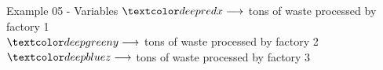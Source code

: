 \begin{frame}{Example 05 - Variables}
\LARGE{
$\colora{x} \longrightarrow$
    tons of waste processed by factory 1 \\ \vspace{1cm}
$\colorb{y} \longrightarrow$
    tons of waste processed by factory 2 \\ \vspace{1cm}
$\colorc{z} \longrightarrow$
    tons of waste processed by factory 3
}
\end{frame}
